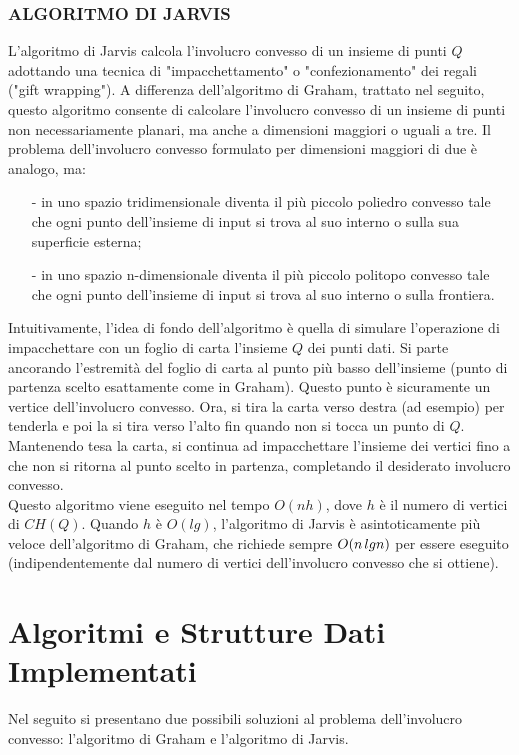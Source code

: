 \documentclass[12pt,a4paper]{report}
\begin{document}
\subsection*{\small{ALGORITMO DI JARVIS}}
L'algoritmo di Jarvis calcola l'involucro convesso di un insieme di punti $Q$ adottando una tecnica di "impacchettamento" o "confezionamento" dei regali ("gift wrapping"). A differenza dell'algoritmo di Graham, trattato nel seguito, questo algoritmo consente di calcolare l'involucro convesso di un insieme di punti non necessariamente planari, ma anche a dimensioni maggiori o uguali a tre. Il problema dell'involucro convesso formulato per dimensioni maggiori di due è analogo, ma:
\begin{itemize}
    \item[-] in uno spazio tridimensionale diventa il più piccolo poliedro convesso tale che ogni punto dell'insieme di input si trova al suo interno o sulla sua superficie esterna;
    \item[-] in uno spazio n-dimensionale diventa il più piccolo politopo convesso tale che ogni punto dell'insieme di input si trova al suo interno o sulla frontiera.
\end{itemize}
Intuitivamente, l'idea di fondo dell'algoritmo è quella di simulare l'operazione di impacchettare con un foglio di carta l'insieme $Q$ dei punti dati. Si parte ancorando l'estremità del foglio di carta al punto più basso dell'insieme (punto di partenza scelto esattamente come in Graham). Questo punto è sicuramente un vertice dell'involucro convesso. Ora, si tira la carta verso destra (ad esempio) per tenderla e poi la si tira verso l'alto fin quando non si tocca un punto di $Q$. Mantenendo tesa la carta, si continua ad impacchettare l'insieme dei vertici fino a che non si ritorna al punto scelto in partenza, completando il desiderato involucro convesso.\\
Questo algoritmo viene eseguito nel tempo $O(nh)$, dove $h$ è il numero di vertici di $CH(Q)$. Quando $h$ è $O(lg)$, l'algoritmo di Jarvis è asintoticamente più veloce dell'algoritmo di Graham, che richiede sempre $O(n\hspace{0.05cm}lgn)$ per essere eseguito (indipendentemente dal numero di vertici dell'involucro convesso che si ottiene).

\chapter{Algoritmi e Strutture Dati Implementati}\label{ch:implementazione}
Nel seguito si presentano due possibili soluzioni al problema dell'involucro convesso: l'algoritmo di Graham e l'algoritmo di Jarvis.
\end{document}
